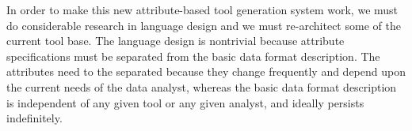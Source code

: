 \documentclass[11pt]{article}
\begin{document}
In order to make this new attribute-based tool generation system work,
we must do considerable research in language design and we must
re-architect some of the current tool base.  The language design is
nontrivial because attribute specifications must be separated from the
basic data format description.  The attributes need to the separated
because they change frequently and depend upon the current needs of
the data analyst, whereas the basic data format description is
independent of any given tool or any given analyst, and ideally
persists indefinitely.




\end{document}
